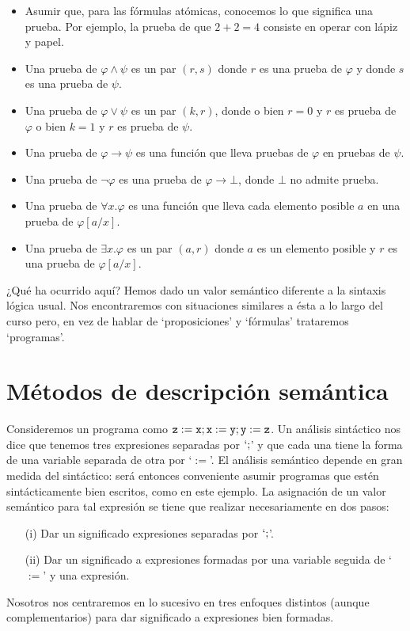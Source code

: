 \begin{itemize}
    \item Asumir que, para las fórmulas atómicas, conocemos lo que significa una prueba. Por ejemplo, la prueba de que $2 + 2 = 4$ consiste en operar con lápiz y papel.
    \item Una prueba de $\varphi \land \psi$ es un par $(r, s)$ donde $r$ es una prueba de $\varphi$ y donde $s$ es una prueba de $\psi$.
    \item Una prueba de $\varphi \lor \psi$ es un par $(k, r)$, donde o bien $r=0$ y $r$ es prueba de $\varphi$ o bien $k=1$ y $r$ es prueba de $\psi$.
    \item Una prueba de $\varphi \rightarrow \psi$ es una función que lleva pruebas de $\varphi$ en pruebas de $\psi$.
    \item Una prueba de $\neg \varphi$ es una prueba de $\varphi \rightarrow \bot$, donde $\bot$ no admite prueba.
    \item Una prueba de $\forall x. \varphi$ es una función que lleva cada elemento posible $a$ en una prueba de $\varphi[a/x]$.
    \item Una prueba de $\exists x.\varphi$ es un par $(a, r)$ donde $a$ es un elemento posible y $r$ es una prueba de $\varphi[a/x]$.
\end{itemize}
¿Qué ha ocurrido aquí? Hemos dado un valor semántico diferente a la sintaxis lógica usual. Nos encontraremos con situaciones similares a ésta a lo largo del curso pero, en vez de hablar de `proposiciones' y `fórmulas' trataremos `programas'.

\section{Métodos de descripción semántica}

Consideremos un programa como $\texttt{z}:= \texttt{x}; \texttt{x} := \texttt{y}; \texttt{y} := \texttt{z}$. Un análisis sintáctico nos dice que tenemos tres expresiones separadas por $`;$' y que cada una tiene la forma de una variable separada de otra por `$:=$'. El análisis semántico depende en gran medida del sintáctico: será entonces conveniente asumir programas que estén sintácticamente bien escritos, como en este ejemplo. La asignación de un valor semántico para tal expresión se tiene que realizar necesariamente en dos pasos: 
\begin{itemize}
    \item[(i)] Dar un significado expresiones separadas por $`;$'.
    \item[(ii)]  Dar un significado a expresiones formadas por una variable seguida de `$:=$' y una expresión.
\end{itemize}
Nosotros nos centraremos en lo sucesivo en tres enfoques distintos (aunque complementarios) para dar significado a expresiones bien formadas.


